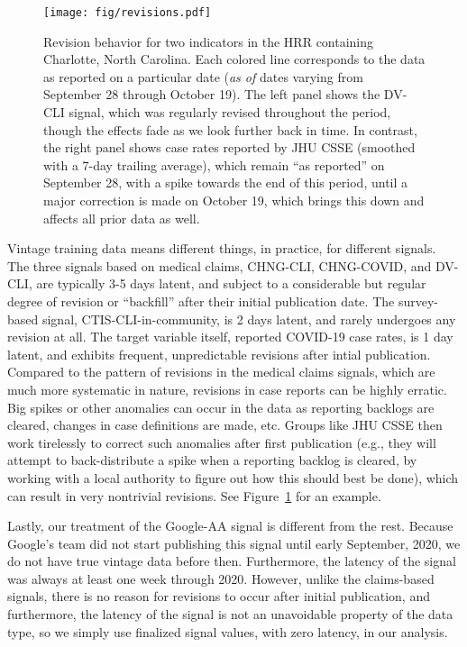 \documentclass[9pt,twocolumn,twoside,lineno]{pnas-new}
\begin{document}
\begin{figure}[tb!]
  \texttt{[image: fig/revisions.pdf]}
  \caption{Revision behavior for two indicators in the HRR containing Charlotte, 
    North Carolina.  Each colored line corresponds to the data as reported on a
    particular date (\textit{as of} dates varying from September 28 through
    October 19). The left panel shows the DV-CLI signal, which was regularly
    revised throughout the period, though the effects fade as we look further
    back in time. In contrast, the right panel shows case rates reported by JHU
    CSSE (smoothed with a 7-day trailing average), which remain ``as reported''
    on September 28, with a spike towards the end of this period, until a major 
    correction is made on October 19, which brings this down and affects all
    prior data as well.}  
  \label{fig:vintage}
\end{figure}

Vintage training data means different things, in practice, for different
signals. The three signals based on medical claims, CHNG-CLI, CHNG-COVID, and
DV-CLI, are typically 3-5 days latent, and subject to a considerable but
regular degree of revision or ``backfill'' after their initial publication date.
The survey-based signal, CTIS-CLI-in-community, is 2 days latent, and rarely
undergoes any revision at all.  The target variable itself, reported COVID-19
case rates, is 1 day latent, and exhibits frequent, unpredictable revisions
after intial publication.  Compared to the pattern of revisions in the medical 
claims signals, which are much more systematic in nature, revisions in case
reports can be highly erratic. Big spikes or other anomalies can occur in the
data as reporting backlogs are cleared, changes in case definitions are made,
etc. Groups like JHU CSSE then work tirelessly to correct such anomalies after
first publication (e.g., they will attempt to back-distribute a spike when a
reporting backlog is cleared, by working with a local authority to figure out
how this should best be done), which can result in very nontrivial revisions.
See Figure~\ref{fig:vintage} for an example. 

Lastly, our treatment of the Google-AA signal is different from the rest.
Because Google's team did not start publishing this signal until early
September, 2020, we do not have true vintage data before then.  Furthermore, the
latency of the signal was always at least one week through 2020.
However, unlike the claims-based signals, there is no reason for revisions to
occur after initial publication, 
and furthermore,
the latency of the signal is not an unavoidable property of the data type, so we
simply use finalized signal values, with zero latency, in our analysis.   
\end{document}
